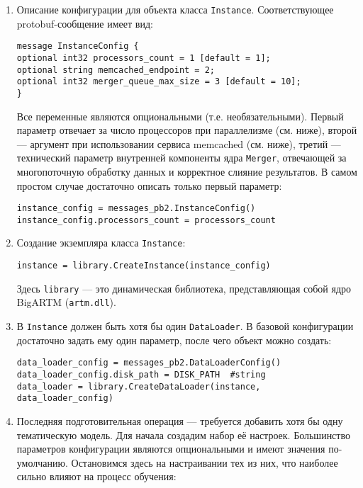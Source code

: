 \begin{enumerate}
	\item Описание конфигурации для объекта класса \verb'Instance'. Соответствующее protobuf-сообщение имеет вид:
	
	\vspace{5pt}
	\verb|message InstanceConfig {| \\
	\verb|optional int32 processors_count = 1 [default = 1];| \\
	\verb|optional string memcached_endpoint = 2;| \\
	\verb|optional int32 merger_queue_max_size = 3 [default = 10];| \\
	\verb|}|
	
	Все переменные являются опциональными (т.е. необязательными). Первый параметр отвечает за число процессоров при параллелизме (см. ниже), второй --- аргумент при использовании сервиса memcached (см. ниже), третий --- технический параметр внутренней компоненты ядра \verb'Merger', отвечающей за многопоточную обработку данных и корректное слияние результатов. В самом простом случае достаточно описать только первый параметр:
	
	\vspace{5pt}
	\verb|instance_config = messages_pb2.InstanceConfig()| \\
	\verb|instance_config.processors_count = processors_count|
		
	\item Создание экземпляра класса \verb'Instance': 
	
	\vspace{5pt}
	\verb|instance = library.CreateInstance(instance_config)|
	
	Здесь \verb'library' --- это динамическая библиотека, представляющая собой ядро BigARTM (\verb'artm.dll').
	
	\item В \verb'Instance' должен быть хотя бы один \verb'DataLoader'. В базовой конфигурации достаточно задать ему один параметр, после чего объект можно создать:
	
	\vspace{5pt}
	\verb|data_loader_config = messages_pb2.DataLoaderConfig()| \\
	\verb|data_loader_config.disk_path = DISK_PATH  #string| \\
	\verb|data_loader = library.CreateDataLoader(instance, data_loader_config)|
	
	\item Последняя подготовительная операция --- требуется добавить хотя бы одну тематическую модель. Для начала создадим набор её настроек. Большинство параметров конфигурации являются опциональными и имеют значения по-умолчанию. Остановимся здесь на настраивании тех из них, что наиболее сильно влияют на процесс обучения:


\end{enumerate}

